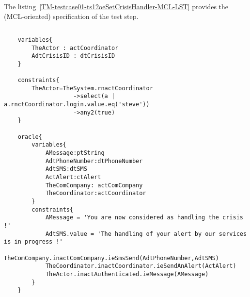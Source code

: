 \begin{teststepmodel}
			{ }
			{ }
			{ }
			{ }
			{ }
			{ }

	\end{teststepmodel}
	
	
	
		
	\vspace{1cm}
	The listing~\ref{TM-testcase01-ts12oeSetCrisisHandler-MCL-LST} provides the \msrmessir (MCL-oriented) specification of the test step.
	
	\scriptsize
	\vspace{0.5cm}
	\begin{lstlisting}[style=MessirStyle,firstnumber=auto,captionpos=b,caption={\msrmessir (MCL-oriented) specification of the test step \emph{testcase01-ts12oeSetCrisisHandler}.},label=TM-testcase01-ts12oeSetCrisisHandler-MCL-LST]

	variables{
		TheActor : actCoordinator
		AdtCrisisID : dtCrisisID
	}
	
	constraints{
		TheActor=TheSystem.rnactCoordinator
		            ->select(a | a.rnctCoordinator.login.value.eq('steve'))
		            ->any2(true)
	}
	
	oracle{
		variables{
			AMessage:ptString
			AdtPhoneNumber:dtPhoneNumber
			AdtSMS:dtSMS
			ActAlert:ctAlert
			TheComCompany: actComCompany
			TheCoordinator:actCoordinator
		}
		constraints{
			AMessage = 'You are now considered as handling the crisis !'
			AdtSMS.value = 'The handling of your alert by our services is in progress !'
			TheComCompany.inactComCompany.ieSmsSend(AdtPhoneNumber,AdtSMS)
			TheCoordinator.inactCoordinator.ieSendAnAlert(ActAlert)
			TheActor.inactAuthenticated.ieMessage(AMessage)
		}
	}
	
	\end{lstlisting}
	\normalsize 
	
	
